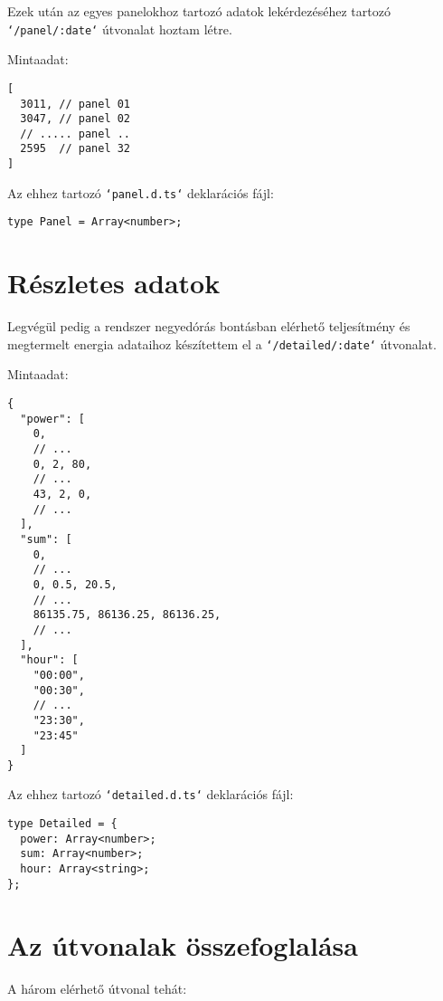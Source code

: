 Ezek után az egyes panelokhoz tartozó adatok lekérdezéséhez tartozó
\texttt{`/panel/:date`} útvonalat hoztam létre.

Mintaadat:

\begin{verbatim}
[
  3011, // panel 01
  3047, // panel 02
  // ..... panel ..
  2595  // panel 32
]
\end{verbatim}

Az ehhez tartozó \texttt{`panel.d.ts`} deklarációs fájl:

\begin{verbatim}
type Panel = Array<number>;
\end{verbatim}

\section{Részletes adatok}

Legvégül pedig a rendszer negyedórás bontásban elérhető teljesítmény és
megtermelt energia adataihoz készítettem el a \texttt{`/detailed/:date`}
útvonalat.

Mintaadat:

\begin{verbatim}
{
  "power": [
    0,
    // ...
    0, 2, 80,
    // ...
    43, 2, 0,
    // ...
  ],
  "sum": [
    0,
    // ...
    0, 0.5, 20.5,
    // ...
    86135.75, 86136.25, 86136.25,
    // ...
  ],
  "hour": [
    "00:00",
    "00:30",
    // ...
    "23:30",
    "23:45"
  ]
}
\end{verbatim}

Az ehhez tartozó \texttt{`{}detailed.d.ts`} deklarációs fájl:

\begin{verbatim}
type Detailed = {
  power: Array<number>;
  sum: Array<number>;
  hour: Array<string>;
};
\end{verbatim}

\section{Az útvonalak összefoglalása}

A három elérhető útvonal tehát:

